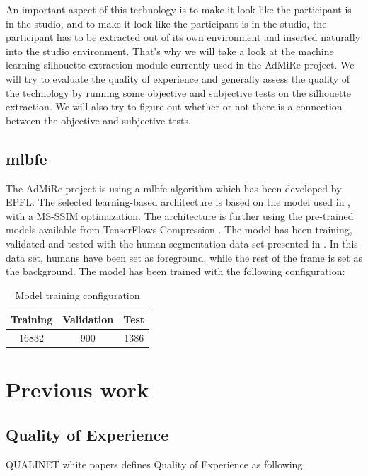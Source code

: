 An important aspect of this technology is to make it look like the participant is in the studio, and to make it look like the participant is in the studio, the participant has to be extracted out of its own environment and inserted naturally into the studio environment. That's why we will take a look at the machine learning silhouette extraction module currently used in the AdMiRe project. We will try to evaluate the quality of experience and generally assess the quality of the technology by running some objective and subjective tests on the silhouette extraction. We will also try to figure out whether or not there is a connection between the objective and subjective tests. 


\subsection{\acrlong{mlbfe}}
The AdMiRe project is using a \acrlong{mlbfe} algorithm which has been developed by EPFL. The selected learning-based architecture is based on the model used in \cite{bmshj2018}, with a MS-SSIM optimazation. The architecture is further using the pre-trained models available from TenserFlows Compression \cite{tensorflow_compression}.
The model has been training, validated and tested with the human segmentation data set presented in \cite{gmnu21}. In this data set, humans have been set as foreground, while the rest of the frame is set as the background. The model has been trained with the following configuration:


\begin{table}[H]
    \centering
    \begin{tabular}{||c c c||} 
         \hline
         Training & Validation & Test \\ [0.5ex] 
         \hline\hline
         16832 & 900 & 1386 \\ [1ex] 
         \hline
    \end{tabular}
    \caption{Model training configuration}
    \label{tab:model_trainign}
\end{table}


\section{Previous work}

\subsection{Quality of Experience}
\label{sec:qoe}
QUALINET white papers defines Quality of Experience as following \cite{book_QoE}

